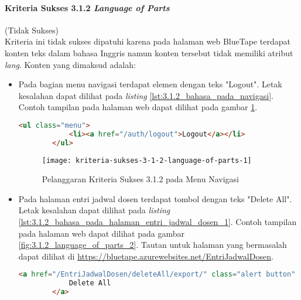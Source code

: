 \paragraph{Kriteria Sukses 3.1.2 \textit{Language of Parts}}
\label{par:kepatuhan_bluetape_kriteria_sukses_3.1.2}
(Tidak Sukses)\\

Kriteria ini tidak sukses dipatuhi karena pada halaman web BlueTape terdapat konten teks dalam bahasa Inggris namun konten tersebut tidak memiliki atribut \textit{lang}. Konten yang dimaksud adalah:

\begin{itemize}
    \item Pada bagian menu navigasi terdapat elemen dengan teks "Logout". Letak kesalahan dapat dilihat pada \textit{listing} \ref{lst:3.1.2_bahasa_pada_navigasi}. Contoh tampilan pada halaman web dapat dilihat pada gambar \ref{fig:3.1.2_language_of_parts_1}. 
    \begin{lstlisting}[frame=single, label={lst:3.1.2_bahasa_pada_navigasi}, language=HTML, caption=Pelanggaran Kriteria Sukses 3.1.2 pada Menu Navigasi]
        <ul class="menu">
            <li><a href="/auth/logout">Logout</a></li>
        </ul>
    \end{lstlisting}
    
    \begin{figure}[H]
        \centering  
        \texttt{[image: kriteria-sukses-3-1-2-language-of-parts-1]}  
        \caption[Pelanggaran Kriteria Sukses 3.1.2 pada Menu Navigasi]{Pelanggaran Kriteria Sukses 3.1.2 pada Menu Navigasi}
        \label{fig:3.1.2_language_of_parts_1}  
    \end{figure}

    \item Pada halaman entri jadwal dosen terdapat tombol dengan teks "Delete All". Letak kesalahan dapat dilihat pada \textit{listing} \ref{lst:3.1.2_bahasa_pada_halaman_entri_jadwal_dosen_1}. Contoh tampilan pada halaman web dapat dilihat pada gambar \ref{fig:3.1.2_language_of_parts_2}. Tautan untuk halaman yang bermasalah dapat dilihat di \url{https://bluetape.azurewebsites.net/EntriJadwalDosen}.
    \begin{lstlisting}[frame=single, label={lst:3.1.2_bahasa_pada_halaman_entri_jadwal_dosen_1}, language=HTML, caption=Pelanggaran Kriteria Sukses 3.1.2 pada Halaman Entri Jadwal Dosen]
        <a href="/EntriJadwalDosen/deleteAll/export/" class="alert button" onClick="return konfirmasi();">
            Delete All
        </a>
    \end{lstlisting}
    

\end{itemize}
